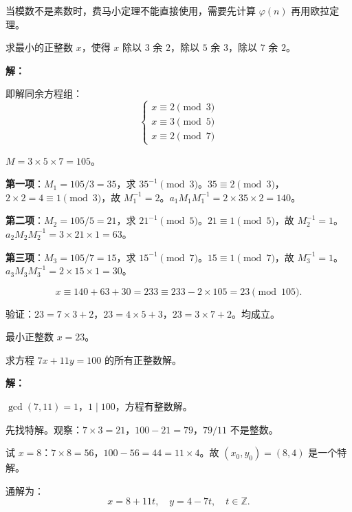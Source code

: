 \documentclass[12pt, a4paper]{ctexart}
\begin{document}
\begin{tipbox}[方法总结]
当模数不是素数时，费马小定理不能直接使用，需要先计算 $\varphi(n)$ 再用欧拉定理。
\end{tipbox}

\begin{examplebox}[【例题7】中国剩余定理]
求最小的正整数 $x$，使得 $x$ 除以 $3$ 余 $2$，除以 $5$ 余 $3$，除以 $7$ 余 $2$。
\end{examplebox}

\textbf{解：}

即解同余方程组：
\[
\begin{cases}
x \equiv 2 \pmod{3} \\
x \equiv 3 \pmod{5} \\
x \equiv 2 \pmod{7}
\end{cases}
\]

$M = 3 \times 5 \times 7 = 105$。

\textbf{第一项}：$M_1 = 105/3 = 35$，求 $35^{-1} \pmod{3}$。$35 \equiv 2 \pmod{3}$，$2 \times 2 = 4 \equiv 1 \pmod{3}$，故 $M_1^{-1} = 2$。$a_1 M_1 M_1^{-1} = 2 \times 35 \times 2 = 140$。

\textbf{第二项}：$M_2 = 105/5 = 21$，求 $21^{-1} \pmod{5}$。$21 \equiv 1 \pmod{5}$，故 $M_2^{-1} = 1$。$a_2 M_2 M_2^{-1} = 3 \times 21 \times 1 = 63$。

\textbf{第三项}：$M_3 = 105/7 = 15$，求 $15^{-1} \pmod{7}$。$15 \equiv 1 \pmod{7}$，故 $M_3^{-1} = 1$。$a_3 M_3 M_3^{-1} = 2 \times 15 \times 1 = 30$。

\[ x \equiv 140 + 63 + 30 = 233 \equiv 233 - 2 \times 105 = 23 \pmod{105}. \]

验证：$23 = 7 \times 3 + 2$，$23 = 4 \times 5 + 3$，$23 = 3 \times 7 + 2$。均成立。

最小正整数 $x = \boxed{23}$。

\begin{examplebox}[【例题8】二元一次不定方程]
求方程 $7x + 11y = 100$ 的所有正整数解。
\end{examplebox}

\textbf{解：}

$\gcd(7, 11) = 1$，$1 \mid 100$，方程有整数解。

先找特解。观察：$7 \times 3 = 21$，$100 - 21 = 79$，$79/11$ 不是整数。

试 $x = 8$：$7 \times 8 = 56$，$100 - 56 = 44 = 11 \times 4$。故 $(x_0, y_0) = (8, 4)$ 是一个特解。

通解为：
\[ x = 8 + 11t, \quad y = 4 - 7t, \quad t \in \mathbb{Z}. \]
\end{document}
